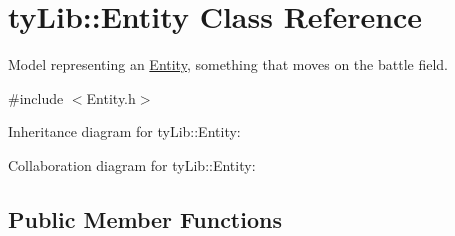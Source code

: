 \hypertarget{classty_lib_1_1_entity}{}\section{ty\+Lib\+:\+:Entity Class Reference}
\label{classty_lib_1_1_entity}


Model representing an \hyperlink{classty_lib_1_1_entity}{Entity}, something that moves on the battle field.  




{\ttfamily \#include $<$Entity.\+h$>$}



Inheritance diagram for ty\+Lib\+:\+:Entity\+:


Collaboration diagram for ty\+Lib\+:\+:Entity\+:
\subsection*{Public Member Functions}
